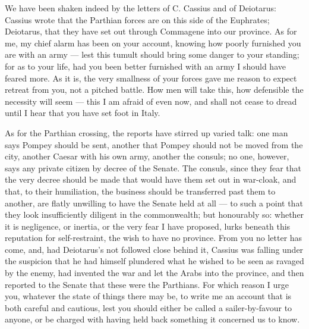 

 We have been shaken indeed by the letters of C. Cassius and of Deiotarus: Cassius wrote that the Parthian forces are on this side of the Euphrates; Deiotarus, that they have set out through Commagene into our province. As for me, my chief alarm has been on your account, knowing how poorly furnished you are with an army --- lest this tumult should bring some danger to your standing; for as to your life, had you been better furnished with an army I should have feared more. As it is, the very smallness of your forces gave me reason to expect retreat from you, not a pitched battle. How men will take this, how defensible the necessity will seem --- this I am afraid of even now, and shall not cease to dread until I hear that you have set foot in Italy.

 As for the Parthian crossing, the reports have stirred up varied talk: one man says Pompey should be sent, another that Pompey should not be moved from the city, another Caesar with his own army, another the consuls; no one, however, says any private citizen by decree of the Senate. The consuls, since they fear that the very decree should be made that would have them set out in war-cloak, and that, to their humiliation, the business should be transferred past them to another, are flatly unwilling to have the Senate held at all --- to such a point that they look insufficiently diligent in the commonwealth; but honourably so: whether it is negligence, or inertia, or the very fear I have proposed, lurks beneath this reputation for self-restraint, the wish to have no province. From you no letter has come, and, had Deiotarus's not followed close behind it, Cassius was falling under the suspicion that he had himself plundered what he wished to be seen as ravaged by the enemy, had invented the war and let the Arabs into the province, and then reported to the Senate that these were the Parthians. For which reason I urge you, whatever the state of things there may be, to write me an account that is both careful and cautious, lest you should either be called a sailer-by-favour to anyone, or be charged with having held back something it concerned us to know.

